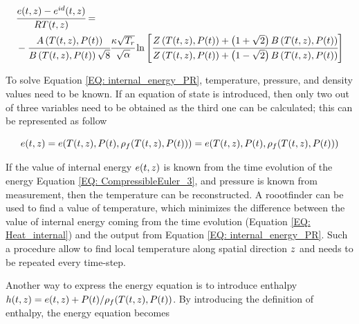 \documentclass[../Article_Sensitivity_Analsysis.tex]{subfiles}
\begin{document}
			{\scriptsize
				\begin{equation}
					\begin{aligned}
					&\cfrac{{\color{black}e}(t,z)-{\color{black}e}^{id}(t,z)}{R{\color{black}T}(t,z)} = \\
					& - \cfrac{{\color{black}A}\left({\color{black}T}(t,z), {\color{black}P}(t)\right)}{{\color{black}B}\left({\color{black}T}(t,z), {\color{black}P}(t)\right)\sqrt{8}} \cfrac{{\color{black}\kappa} \sqrt{\color{black}T_r}}{\sqrt{\alpha}} \ln \left[ \cfrac{{\color{black}Z}\left({\color{black}T}(t,z), {\color{black}P}(t)\right)+\left( 1+\sqrt{2} \right){\color{black}B}\left({\color{black}T}(t,z), {\color{black}P}(t)\right)}{{\color{black}Z}\left({\color{black}T}(t,z), {\color{black}P}(t)\right)+\left( 1-\sqrt{2} \right){\color{black}B}\left({\color{black}T}(t,z), {\color{black}P}(t)\right)} \right]
					\label{EQ: internal_energy_PR}
				\end{aligned}
			\end{equation}
			}
			
			To solve Equation \ref{EQ: internal_energy_PR}, temperature, pressure, and density values need to be known. If an equation of state is introduced, then only two out of three variables need to be obtained as the third one can be calculated; this can be represented as follow
			
			{\footnotesize
			\begin{equation}
				{\color{black}e}(t,z)={\color{black}e}({\color{black}T}(t,z),{\color{black}P}(t),{\color{black}\rho_f}({\color{black}T}(t,z),{\color{black}P}(t)))=e( {\color{black}T}(t,z),{\color{black}P}(t), {\color{black}\rho_f}({\color{black}T}(t,z),{\color{black}P}(t)) ) 
			\end{equation}
			}
		
			If the value of internal energy ${\color{black}e}(t,z)$ is known from the time evolution of the energy Equation \ref{EQ: CompressibleEuler_3}, and pressure is known from measurement, then the temperature can be reconstructed. A roootfinder can be used to find a value of temperature, which minimizes the difference between the value of internal energy coming from the time evolution (Equation \ref{EQ: Heat_internal}) and the output from Equation \ref{EQ: internal_energy_PR}. Such a procedure allow to find local temperature along spatial direction ${\color{black}z}$ and needs to be repeated every time-step.
			
			Another way to express the energy equation is to introduce enthalpy ${\color{black}h}(t,z) = {\color{black}e}(t,z) + {\color{black}P}(t) / {\color{black}\rho_f}({\color{black}T}(t,z),{\color{black}P}(t))$. By introducing the definition of enthalpy, the energy equation becomes
			
\end{document}
